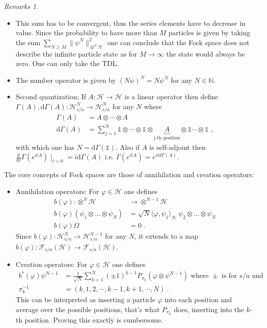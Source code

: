 \documentclass[
a4paper, %
11pt, %
onecolumn, %
openany, %
]{memoir}
\theoremstyle{definition}
\theoremstyle{remark}
\newtheorem{remarks}{Remarks}[chapter]
\theoremstyle{plain}
\begin{document}
\begin{remarks}
	\begin{itemize}
		\item This sum has to be convergent, thus the series elements have to decrease in value. Since the probability to have more than $M$ particles is given by taking the sum $\sum_{N\geq M}\|\psi^N\|^2_{\otimes^N\mathcal{H}}$ one can conclude that the Fock space does not describe the infinite particle state as for $M\rightarrow\infty$ the state would always be zero. One can only take the TDL.
		\item The number operator is given by $(N\psi)^N=N\psi^N$ for any $N\in \mathbb{N}$.
		\item Second quantization: If $A:\mathcal{H}\rightarrow \mathcal{H}$ is a linear operator then define $\Gamma(A),\mathrm{d}\Gamma(A):\mathcal{H}_{s/a}^N\rightarrow \mathcal{H}_{s/a}^N$ for any $N$ where \begin{align}
		\Gamma(A)&=A\otimes \cdots \otimes A\\
		\mathrm{d}\Gamma(A)&=\sum_{j=1}^N\mathds{1}\otimes\cdots\otimes \mathds{1}\otimes \underbrace{A}_{\text{j-th position}}\otimes \mathds{1}\cdots \otimes \mathds{1}\;,
		\end{align}
		with which one has $N=\mathrm{d}\Gamma(\mathds{1})$. Also if $A$ is self-adjoint then $\frac{\mathrm{d}}{\mathrm{d}t}\Gamma(e^{itA})\mid_{t=0}=i\mathrm{d}\Gamma(A)$ i.e. $\Gamma(e^{itA})=e^{itd\Gamma(A)}$.
	\end{itemize}
\end{remarks}
The core concepts of Fock spaces are those of annihilation and creation operators: \begin{itemize}
	\item Annihilation operators: For $\varphi\in\mathcal{H}$ one defines \begin{align}
	b(\varphi):\otimes^N\mathcal{H}&\longrightarrow \otimes^{N-1}\mathcal{H}\\
	b(\varphi)(\psi_1\otimes\ldots\otimes\psi_N)&=\sqrt{N}\langle \varphi,\psi_1\rangle_{\mathcal{H}}~\psi_2\otimes\ldots\otimes\psi_N\\
	b(\varphi)\Omega &= 0\; .
	\end{align}
	Since $b(\varphi):\mathcal{H}_{s/a}^N\rightarrow \mathcal{H}_{s/a}^{N-1}$ for any $N$, it extends to a map $b(\varphi):\mathcal{F}_{s/a}(\mathcal{H})\rightarrow \mathcal{F}_{s/a}(\mathcal{H})$.
	\item Creation operators: For $\varphi\in\mathcal{H}$ one defines \begin{align}
	b^*(\varphi)\psi^{N-1}&=\frac{1}{\sqrt{N}}\sum_{k=1}^{N}(\pm 1)^{k-1}P_{\pi_k}(\varphi\otimes \psi^{N-1}) \text{ where $\pm$ is for $s/a$ and}\\
	\pi_k^{-1}&=(k,1,2,\cdots,k-1,k+1,\cdots,N)\; .
	\end{align}
	This can be interpreted as inserting a particle $\varphi$ into each position and average over the possible positions, that's what $P_{\pi_k}$ does, inserting into the $k$-th position. Proving this exactly is cumbersome.
	\end{itemize}
\end{document}
